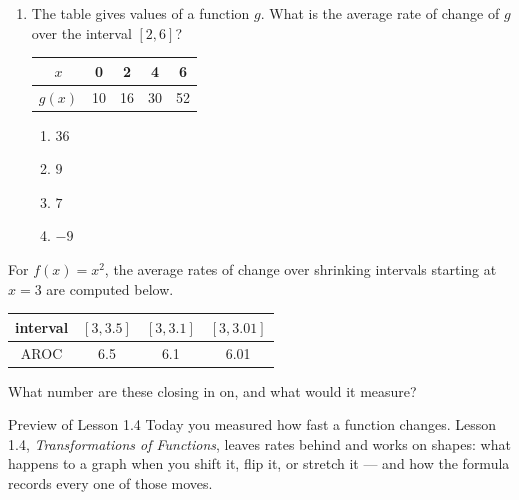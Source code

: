 \documentclass[10pt]{article}
\begin{document}
\begin{enumerate}[itemsep=10pt]
\begin{enumerate}[label=(\alph*), itemsep=4pt]
  \item $A$ is a \blank{2.4cm} function, and it is concave \blank{1.6cm}.
  \item $B$ is a \blank{2.4cm} function, with slope \blank{1.6cm}.
\end{enumerate}

\item The table gives values of a function $g$. What is the average rate of
      change of $g$ over the interval $[2, 6]$?

\smallskip
\renewcommand{\arraystretch}{1.4}
\begin{tabular}{|c|c|c|c|c|}
\hline
$x$ & 0 & 2 & 4 & 6 \\
\hline
$g(x)$ & 10 & 16 & 30 & 52 \\
\hline
\end{tabular}
\smallskip

\begin{enumerate}[label=\Alph*., itemsep=3pt]
  \item $36$
  \item $9$
  \item $7$
  \item $-9$
\end{enumerate}

\end{enumerate}

\vspace{0.1in}

\boxguard
\begin{extensionbox}
For $f(x) = x^2$, the average rates of change over shrinking intervals
starting at $x = 3$ are computed below.

\smallskip
\begin{center}
\renewcommand{\arraystretch}{1.4}
\begin{tabular}{|c|c|c|c|}
\hline
interval & $[3, 3.5]$ & $[3, 3.1]$ & $[3, 3.01]$ \\
\hline
AROC & 6.5 & 6.1 & 6.01 \\
\hline
\end{tabular}
\end{center}
\smallskip

What number are these closing in on, and what would it measure?

\vspace{0.05in}
\end{extensionbox}

\vspace{0.1in}

\boxguard[9]
\begin{notesbox}{Preview of Lesson 1.4}
Today you measured how fast a function changes. Lesson 1.4,
\textit{Transformations of Functions}, leaves rates behind and works on
shapes: what happens to a graph when you shift it, flip it, or stretch it ---
and how the formula records every one of those moves.
\end{notesbox}
\end{document}
